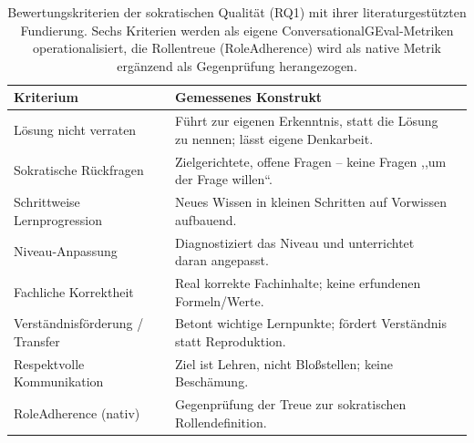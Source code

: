 \begin{table}[htbp]
    \centering
    \caption{Bewertungskriterien der sokratischen Qualität (RQ1) mit ihrer
    literaturgestützten Fundierung. Sechs Kriterien werden als eigene
    ConversationalGEval-Metriken operationalisiert, die Rollentreue (RoleAdherence)
    wird als native Metrik ergänzend als Gegenprüfung herangezogen.}
    \label{tab:rq1-kriterien}
    \small

    \begin{tabular}{p{3.6cm}p{6.4cm}p{3.4cm}}
        \toprule
        \textbf{Kriterium} &
        \textbf{Gemessenes Konstrukt} \\
        \midrule

        Lösung nicht verraten &
        Führt zur eigenen Erkenntnis, statt die Lösung zu nennen; lässt eigene Denkarbeit. \\

        \addlinespace

        Sokratische Rückfragen &
        Zielgerichtete, offene Fragen -- keine Fragen ,,um der Frage willen``.\\

        \addlinespace

        Schrittweise Lernprogression &
        Neues Wissen in kleinen Schritten auf Vorwissen aufbauend. \\

        \addlinespace

        Niveau-Anpassung &
        Diagnostiziert das Niveau und unterrichtet daran angepasst. \\

        \addlinespace

        Fachliche Korrektheit &
        Real korrekte Fachinhalte; keine erfundenen Formeln/Werte.\\

        \addlinespace

        Verständnisförderung / Transfer &
        Betont wichtige Lernpunkte; fördert Verständnis statt Reproduktion.\\

        \addlinespace

        Respektvolle Kommunikation &
        Ziel ist Lehren, nicht Bloßstellen; keine Beschämung. \\

        \midrule

        RoleAdherence (nativ) &
        Gegenprüfung der Treue zur sokratischen Rollendefinition.\\

        \bottomrule
    \end{tabular}
\end{table}

